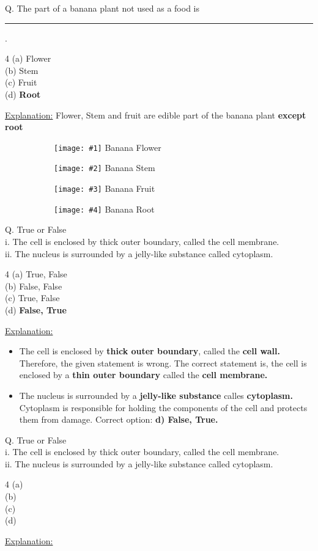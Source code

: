 \documentclass{article}
\newcommand{\mcqfour}[5]{
    \begin{flushleft}
        \color{red}
        Q. #1
        \textbf{}
    \end{flushleft}
    \begin{raggedright}
        \begin{multicols}{4}{}
            (a) #2\\
            (b) #3\\
            (c) #4\\
            (d) #5\\
            \end{multicols}
    \end{raggedright}
}
\newcommand{\images}[8]{
    \begin{figure}[h!]
        \centering
        \begin{subfigure}[b]{0.22\linewidth}
          \texttt{[image: \#1]}
          \color{cyan}#5
        \end{subfigure}
        \begin{subfigure}[b]{0.22\linewidth}
            \texttt{[image: \#2]}
            \color{cyan}#6
        \end{subfigure}
        \begin{subfigure}[b]{0.22\linewidth}
            \texttt{[image: \#3]}
            \color{cyan}#7
          \end{subfigure}
          \begin{subfigure}[b]{0.22\linewidth}
            \texttt{[image: \#4]}
            \color{cyan}#8
          \end{subfigure}
      \end{figure}
}
\newcommand{\explanation}[1]{
    \begin{flushleft}
        \underline{Explanation:}
        \onehalfspacing
        \newline
        #1
    \end{flushleft}
}
\begin{document}
\mcqfour{The part of a banana plant not used as a food is \rule{1cm}{0.5mm} .}{Flower}{Stem}{Fruit}{\textbf{Root}}
\explanation{Flower, Stem and fruit are edible part of the banana plant \textbf{except root}}
\images{bananaFlower}{bananaStem}{bananaFruit}{bananaRoot}{Banana Flower}{Banana Stem}{Banana Fruit}{Banana Root}

\mcqfour{True or False\\i. The cell is enclosed by thick outer boundary, called the cell membrane.\\ii. The nucleus is surrounded  by a jelly-like substance called cytoplasm.}{True, False}{False, False}{True, False}{\textbf{False, True}}
\explanation{
  \begin{itemize}
    \item The cell is enclosed by \textbf{thick outer boundary}, called the \textbf{cell wall.} Therefore, the given statement is wrong. The correct statement is, the cell is enclosed by a \textbf{thin outer boundary} called the \textbf{cell membrane.}
    \item The nucleus is surrounded by a \textbf{jelly-like substance} calles \textbf{cytoplasm.} Cytoplasm is responsible for holding the components of the cell and protects them from damage.
    \newline
    \newline
    Correct option: \textbf{d) False, True.}
  \end{itemize}}

\mcqfour{True or False\\i. The cell is enclosed by thick outer boundary, called the cell membrane.\\ii. The nucleus is surrounded  by a jelly-like substance called cytoplasm.}{}{}{}{}
\explanation{}
\end{document}
